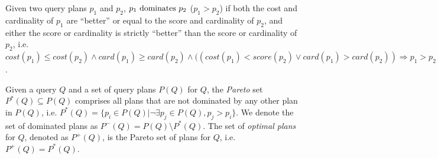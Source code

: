 \begin{definition}[Dominance]
  Given two query plans $p_1$ and $p_2$, $p_1 \mbox{ \textnormal{dominates}
  } p_2$ ($p_1 > p_2$) if both the cost and cardinality of $p_1$ are ``better'' or equal
  to the score and cardinality of $p_2$, and either the score or
  cardinality is strictly ``better'' than the score or cardinality of
  $p_2$, i.e. $cost(p_1) \leq cost(p_2) \wedge card(p_1) \geq
  card(p_2) \wedge ((cost(p_1) < score(p_2) \vee card(p_1) >
  card(p_2)) \Rightarrow p_1 > p_2$.
\end{definition}


\begin{definition}
  Given a query $Q$ and a set of query plans $P(Q)$ for $Q$, the \emph{Pareto}
  set $P^*(Q) \subseteq P(Q)$ comprises all plans that are not
  dominated by any other plan in $P(Q)$, i.e. $P^*(Q) = \{p_i \in P(Q) | \neg\exists p_j\in P(Q), p_j  > p_i\}$. We denote the set of
  dominated plans as $P^-(Q) = P(Q) \setminus P^*(Q)$. The set of \emph{optimal plans} for $Q$, denoted as $P^+(Q)$, is the Pareto set of plans for $Q$, i.e. $P^+(Q) = P^*(Q)$.
\end{definition}


